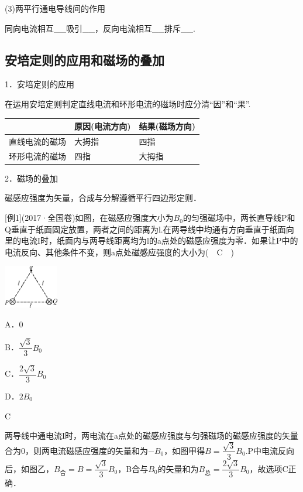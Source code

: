 (3)两平行通电导线间的作用

同向电流相互\_\_吸引\_\_，反向电流相互\_\_排斥\_\_.

\newpage
\subsection{安培定则的应用和磁场的叠加}

1．安培定则的应用

在运用安培定则判定直线电流和环形电流的磁场时应分清``因''和``果''.

\begin{longtable}[]{@{}m{4cm}m{4cm}m{4cm}@{}}
\toprule
 & \begin{minipage}[b]{0.30\columnwidth}\raggedright
原因(电流方向)\strut
\end{minipage} & \begin{minipage}[b]{0.30\columnwidth}\raggedright
结果(磁场方向)\strut
\end{minipage}\tabularnewline
\midrule
\endhead
直线电流的磁场 & 大拇指 & 四指\tabularnewline
环形电流的磁场 & 四指 & 大拇指\tabularnewline
\bottomrule
\end{longtable}


2．磁场的叠加

磁感应强度为矢量，合成与分解遵循平行四边形定则．

{[}例1{]}(2017·全国卷\uppercase\expandafter{})如图，在磁感应强度大小为$B_0$的匀强磁场中，两长直导线P和Q垂直于纸面固定放置，两者之间的距离为l.在两导线中均通有方向垂直于纸面向里的电流I时，纸面内与两导线距离均为l的a点处的磁感应强度为零．如果让P中的电流反向、其他条件不变，则a点处磁感应强度的大小为(　C　)

\begin{center}\includegraphics[width=0.93403in,height=0.73611in]{media/image339.png}\end{center}

A．0 

B．$\dfrac{\sqrt{3}}{3} B_{0}$

C．$\dfrac{2 \sqrt{3}}{3} B_{0}$ 

D．$2B_0$
\begin{solution}
	C
	
	两导线中通电流I时，两电流在a点处的磁感应强度与匀强磁场的磁感应强度的矢量合为0，则两电流磁感应强度的矢量和为$-B_0$，如图甲得$B=\dfrac{\sqrt{3}}{3} B_{0}$.P中电流反向后，如图乙，$B_{\text{合}}=B=\dfrac{\sqrt{3}}{3} B_{0}$，B合与$B_0$的矢量和为$B_{\text{总}}=\dfrac{2\sqrt{3}}{3} B_{0}$，故选项C正确．
\end{solution}

